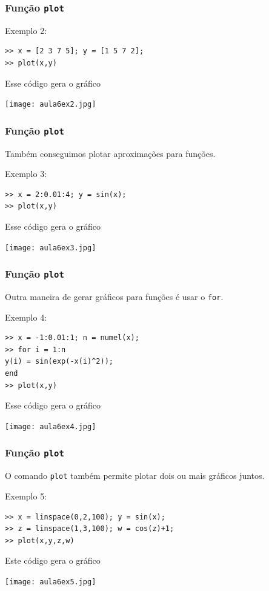 \documentclass{beamer}
\newcommand{\ssiz}{\scriptsize}
\begin{document}
\begin{frame}[fragile]
\frametitle{Fun\c{c}\~ao {\tt plot}}

Exemplo 2:
{\ssiz
\begin{verbatim}
>> x = [2 3 7 5]; y = [1 5 7 2];
>> plot(x,y)
\end{verbatim}
}
\pause
Esse c\'odigo gera o gr\'afico
\begin{center}
\texttt{[image: aula6ex2.jpg]}
\end{center}

\end{frame}

\begin{frame}[fragile]
\frametitle{Fun\c{c}\~ao {\tt plot}}

Tamb\'em conseguimos plotar aproxima\c{c}\~oes para fun\c{c}\~oes.
\pause

Exemplo 3:
{\ssiz
\begin{verbatim}
>> x = 2:0.01:4; y = sin(x);
>> plot(x,y)
\end{verbatim}
}
\pause
Esse c\'odigo gera o gr\'afico
\begin{center}
\texttt{[image: aula6ex3.jpg]}
\end{center}
\end{frame}

\begin{frame}[fragile]
\frametitle{Fun\c{c}\~ao {\tt plot}}

Outra maneira de gerar gr\'aficos para fun\c{c}\~oes \'e usar o {\tt for}.
\pause

Exemplo 4:
{\ssiz
\begin{verbatim}
>> x = -1:0.01:1; n = numel(x);
>> for i = 1:n
y(i) = sin(exp(-x(i)^2));
end
>> plot(x,y)
\end{verbatim}
}
\pause
Esse c\'odigo gera o gr\'afico
\begin{center}
\texttt{[image: aula6ex4.jpg]}
\end{center}
\end{frame}

\begin{frame}[fragile]
\frametitle{Fun\c{c}\~ao {\tt plot}}

O comando {\tt plot} tamb\'em permite plotar dois ou mais gr\'aficos juntos.
\pause

Exemplo 5:
{\ssiz
\begin{verbatim}
>> x = linspace(0,2,100); y = sin(x);
>> z = linspace(1,3,100); w = cos(z)+1;
>> plot(x,y,z,w)
\end{verbatim}}
\pause
Este c\'odigo gera o gr\'afico
\begin{center}
\texttt{[image: aula6ex5.jpg]}
\end{center}

\end{frame}
\end{document}
